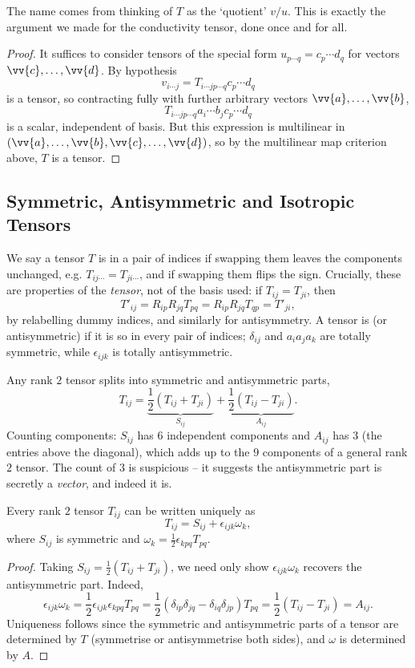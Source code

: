 The name comes from thinking of $T$ as the `quotient' $v/u$. This is exactly the argument we made for the conductivity tensor, done once and for all.

\begin{proof}
	It suffices to consider tensors of the special form $u_{p\cdots q} = c_p \cdots d_q$ for vectors $\vv{c}, \dots, \vv{d}$. By hypothesis
	$$
	v_{i \cdots j} = T_{i \cdots j p \cdots q} c_p \cdots d_q
	$$
	is a tensor, so contracting fully with further arbitrary vectors $\vv{a}, \dots, \vv{b}$,
	$$
	T_{i \cdots j p \cdots q} a_i \cdots b_j c_p \cdots d_q
	$$
	is a scalar, independent of basis. But this expression is multilinear in $(\vv{a}, \dots, \vv{b}, \vv{c}, \dots, \vv{d})$, so by the multilinear map criterion above, $T$ is a tensor.
\end{proof}

\subsection{Symmetric, Antisymmetric and Isotropic Tensors}

We say a tensor $T$ is  in a pair of indices if swapping them leaves the components unchanged, e.g. $T_{ij\cdots} = T_{ji \cdots}$, and  if swapping them flips the sign. Crucially, these are properties of the \emph{tensor}, not of the basis used: if $T_{ij} = T_{ji}$, then
$$
T'_{ij} = R_{ip}R_{jq}T_{pq} = R_{ip}R_{jq}T_{qp} = T'_{ji},
$$
by relabelling dummy indices, and similarly for antisymmetry. A tensor is  (or antisymmetric) if it is so in every pair of indices; $\delta_{ij}$ and $a_i a_j a_k$ are totally symmetric, while $\epsilon_{ijk}$ is totally antisymmetric.

Any rank $2$ tensor splits into symmetric and antisymmetric parts,
$$
T_{ij} = \underbrace{\frac{1}{2}(T_{ij} + T_{ji})}_{S_{ij}} + \underbrace{\frac{1}{2}(T_{ij} - T_{ji})}_{A_{ij}}.
$$
Counting components: $S_{ij}$ has $6$ independent components and $A_{ij}$ has $3$ (the entries above the diagonal), which adds up to the $9$ components of a general rank $2$ tensor. The count of $3$ is suspicious -- it suggests the antisymmetric part is secretly a \emph{vector}, and indeed it is.

\begin{proposition}
	Every rank $2$ tensor $T_{ij}$ can be written uniquely as
	$$
	T_{ij} = S_{ij} + \epsilon_{ijk} \omega_k,
	$$
	where $S_{ij}$ is symmetric and $\omega_k = \frac{1}{2}\epsilon_{kpq} T_{pq}$.
	\end{proposition}
\begin{proof}
	Taking $S_{ij} = \frac{1}{2}(T_{ij} + T_{ji})$, we need only show $\epsilon_{ijk}\omega_k$ recovers the antisymmetric part. Indeed,
	$$
	\epsilon_{ijk}\omega_k = \frac{1}{2}\epsilon_{ijk}\epsilon_{kpq} T_{pq} = \frac{1}{2}(\delta_{ip}\delta_{jq} - \delta_{iq}\delta_{jp}) T_{pq} = \frac{1}{2}(T_{ij} - T_{ji}) = A_{ij}.
	$$
	Uniqueness follows since the symmetric and antisymmetric parts of a tensor are determined by $T$ (symmetrise or antisymmetrise both sides), and $\omega$ is determined by $A$.
\end{proof}

